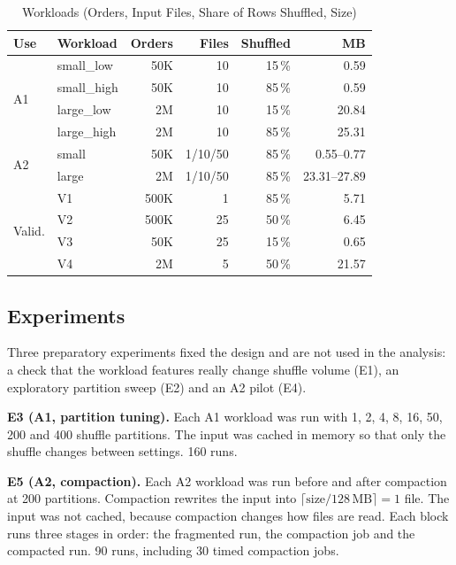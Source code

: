 \begin{table}[t]
\caption{Workloads (Orders, Input Files, Share of Rows Shuffled, Size)}
\label{tab:workloads}
\centering
\small
\setlength{\tabcolsep}{3.5pt}
\begin{tabular}{@{}llrrrr@{}}
\toprule
Use & Workload & Orders & Files & Shuffled & MB \\
\midrule
\multirow{4}{*}{A1} & small\_low   & 50K & 10 & 15\,\% & 0.59 \\
                    & small\_high  & 50K & 10 & 85\,\% & 0.59 \\
                    & large\_low   & 2M  & 10 & 15\,\% & 20.84 \\
                    & large\_high  & 2M  & 10 & 85\,\% & 25.31 \\
\midrule
\multirow{2}{*}{A2} & small        & 50K & 1/10/50 & 85\,\% & 0.55--0.77 \\
                    & large        & 2M  & 1/10/50 & 85\,\% & 23.31--27.89 \\
\midrule
\multirow{4}{*}{Valid.} & V1 & 500K & 1  & 85\,\% & 5.71 \\
                        & V2 & 500K & 25 & 50\,\% & 6.45 \\
                        & V3 & 50K  & 25 & 15\,\% & 0.65 \\
                        & V4 & 2M   & 5  & 50\,\% & 21.57 \\
\bottomrule
\end{tabular}
\end{table}

\subsection{Experiments}
Three preparatory experiments fixed the design and are not used in the analysis: a check that
the workload features really change shuffle volume (E1), an exploratory partition sweep (E2)
and an A2 pilot (E4).

\textbf{E3 (A1, partition tuning).} Each A1 workload was run with 1, 2, 4, 8, 16, 50, 200
and 400 shuffle partitions. The input was cached in memory so that only the shuffle changes
between settings. 160 runs.

\textbf{E5 (A2, compaction).} Each A2 workload was run before and after compaction at 200
partitions. Compaction rewrites the input into $\lceil \text{size}/128\,\text{MB} \rceil = 1$
file. The input was not cached, because compaction changes how files are read. Each block
runs three stages in order: the fragmented run, the compaction job and the compacted run.
90 runs, including 30 timed compaction jobs.

